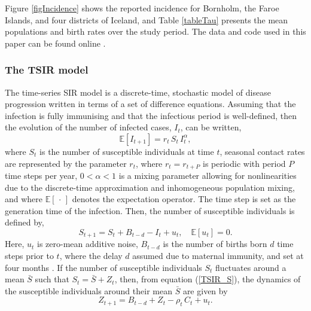 \documentclass[10pt]{article}
\begin{document}
Figure \ref{figIncidence} shows the reported incidence for Bornholm, the Faroe Islands, and four districts of Iceland, and Table \ref{tableTau} presents the mean populations and birth rates over the study period. The data and code used in this paper can be found online \cite{github}.










\subsubsection*{The TSIR model}

The time-series SIR model \cite{Finkenstadt2000} is a discrete-time, stochastic model of disease progression written in terms of a set of difference equations. Assuming that the infection is fully immunising and that the infectious period is well-defined, then the evolution of the number of infected cases, $I_t$, can be written,
\begin{equation}
\mathbb{E}\left[I_{t+1}\right] = r_t \, S_t \, I_t^\alpha,
\label{TSIR_I}
\end{equation}
where $S_t$ is the number of susceptible individuals at time $t$, seasonal contact rates are represented by the parameter $r_t$, where $r_t = r_{t+P}$ is periodic with period $P$ time steps per year, $0 < \alpha < 1$ is a mixing parameter allowing for nonlinearities due to the discrete-time approximation and inhomogeneous population mixing, and where $\mathbb{E}\left[\,\cdot\,\right]$ denotes the expectation operator. The time step is set as the generation time of the infection. Then, the number of susceptible individuals is defined by,
\begin{equation}
S_{t+1} = S_t + B_{t-d} - I_t + u_t, \quad \mathbb{E}\left[u_t\right] = 0.
\label{TSIR_S}
\end{equation}
Here, $u_t$ is zero-mean additive noise, $B_{t-d}$ is the number of births born $d$ time steps prior to $t$, where the delay $d$ assumed due to maternal immunity, and set at four months \cite{Anderson1991}. If the number of susceptible individuals $S_t$ fluctuates around a mean $\bar{S}$ such that $S_t = \bar{S} + Z_t$, then, from equation (\ref{TSIR_S}), the dynamics of the susceptible individuals around their mean $\bar{S}$ are given by
\begin{equation}
Z_{t+1} = B_{t-d} + Z_{t} - \rho_t\,C_t + u_t.
\label{iter}
\end{equation}
\end{document}
